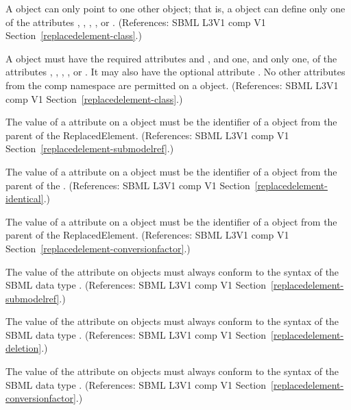 \begin{sbmlenum}
 { A \ReplacedElement object can only point to one other object; that is,
  a \ReplacedElement object can define only one of the attributes  , 
  , , , or .
  (References: SBML L3V1 comp V1 Section~\ref{replacedelement-class}.) }


 { A \ReplacedElement object must have the
  required attributes  and , and one, 
  and only one, of the attributes , 
  , , , or .
  It may also have the optional attribute .
  No other attributes from the comp namespace are permitted on a
  \ReplacedElement object.
  (References: SBML L3V1 comp V1 Section~\ref{replacedelement-class}.) }


 { The value of a  attribute on a
  \ReplacedElement object must be the identifier of a \Submodel object
  from the parent \Model of the ReplacedElement.  
  (References: SBML L3V1 comp V1 Section~\ref{replacedelement-submodelref}.) }


 { The value of a  attribute on a
  \ReplacedElement object must be the identifier of a \Deletion object
  from the parent \Model of the \ReplacedElement.  
  (References: SBML L3V1 comp V1 Section~\ref{replacedelement-identical}.) }


 { The value of a  attribute on a
  \ReplacedElement object must be the identifier of a \Parameter object
  from the parent \Model of the ReplacedElement.  
  (References: SBML L3V1 comp V1 Section~\ref{replacedelement-conversionfactor}.) }


 { The value of the  attribute on
  \ReplacedElement objects must always conform to the syntax of
  the SBML data type .
  (References: SBML L3V1 comp V1 Section~\ref{replacedelement-submodelref}.) }
  

 { The value of the  attribute on
  \ReplacedElement objects must always conform to the syntax of
  the SBML data type .
  (References: SBML L3V1 comp V1 Section~\ref{replacedelement-deletion}.) }
  

 { The value of the  attribute on
  \ReplacedElement objects must always conform to the syntax of
  the SBML data type .
  (References: SBML L3V1 comp V1 Section~\ref{replacedelement-conversionfactor}.) }
  


\end{sbmlenum}
